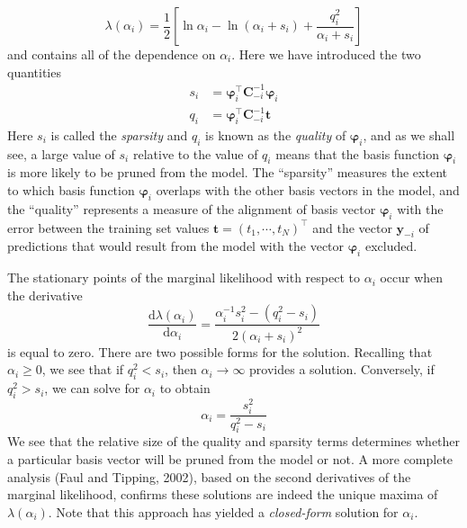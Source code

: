 \documentclass[a4paper]{book}
\newcommand{\ud}{\mathrm{d}}
\renewcommand{\bf}{\mathbf}
\newcommand{\imp}[1]{\textit{#1}}
\newcommand{\bs}{\boldsymbol}
\begin{document}
\begin{equation}
	\lambda(\alpha_i) = \frac{1}{2}  \left[\ln \alpha_i-\ln (\alpha_i+s_i)+\frac{q_i^{2}}{\alpha_i+s_i} \right]
\end{equation}
and contains all of the dependence on $\alpha_i$. Here we have introduced the two quantities
\begin{align}
	s_i &= \bs{\varphi}_i^{\intercal} \bf{C}_{-i}^{-1} \bs{\varphi}_i \\
	q_i &= \bs{\varphi}_i^{\intercal} \bf{C}_{-i}^{-1} \bf{t}
\end{align}
Here $s_i$ is called the \imp{sparsity} and $q_i$ is known as the \imp{quality} of $\bs{\varphi}_i$, and as we shall see, a large value of $s_i$ relative to the value of $q_i$ means that the basis function $\bs{\varphi}_i$ is more likely to be pruned from the model. The ``sparsity'' measures the extent to which basis function $\bs{\varphi}_i$ overlaps with the other basis vectors in the model, and the ``quality'' represents a measure of the alignment of basis vector $\bs{\varphi}_i$ with the error between the training set values $\bf{t} = (t_1,\cdots,t_N)^{\intercal}$ and the vector $\bf{y}_{-i}$ of predictions that would result from the model with the vector $\bs{\varphi}_i$ excluded.

The stationary points of the marginal likelihood with respect to $\alpha_i$ occur when the derivative
\begin{equation}
	\frac{\ud \lambda(\alpha_i)}{\ud \alpha_i} = \frac{\alpha_i^{-1}s_i^2-(q_i^2-s_i)}{2(\alpha_i+s_i)^2}
\end{equation}
is equal to zero. There are two possible forms for the solution. Recalling that $\alpha_i \geq 0$, we see that if $q_i^2 < s_i$, then $\alpha_i \rightarrow \infty $ provides a solution. Conversely, if $q_i^2 > s_i$, we can solve for $\alpha_i$ to obtain
\begin{equation}
	\alpha_i = \frac{s_i^2}{q_i^2-s_i} \label{RVMa}
\end{equation}
We see that the relative size of the quality and sparsity terms determines whether a particular basis vector will be pruned from the model or not. A more complete analysis (Faul and Tipping, 2002), based on the second derivatives of the marginal likelihood, confirms these solutions are indeed the unique maxima of $\lambda(\alpha_i)$. Note that this approach has yielded a \imp{closed-form} solution for $\alpha_i$.
\end{document}
